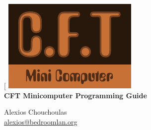\documentclass[11pt,a4paper,twocolumns]{article}
\newcommand\hyperemail[1]{\sf\href{mailto:#1}{#1}}
\begin{document}
\thispagestyle{empty}
\pagestyle{plain}
\twocolumn[
\centering
\includegraphics{figs/cft-logo-v1.pdf}\vspace{2em}\\
{\LARGE\bf CFT Minicomputer Programming Guide}
\vspace{10pt}

{\Large Alexios Chouchoulas}\\\vspace{5pt}
{\large \hyperemail{alexios@bedroomlan.org}}

\vspace{20pt}
\end{document}
